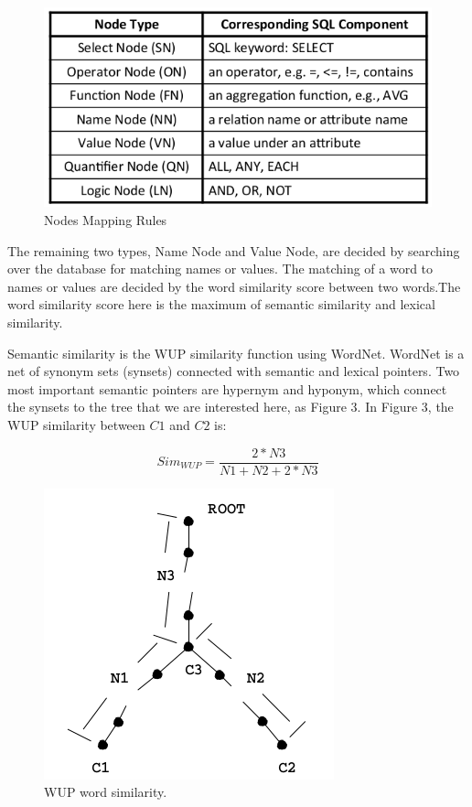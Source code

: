\documentclass[twocolumn]{article}
\begin{document}
\begin{figure}[ht]
  \centering
  \includegraphics[width=0.9\linewidth]{figures/nodes_mapping_rules.png}
  \caption[caption for nodes mapping rules]{Nodes Mapping Rules\protect\footnotemark}
\end{figure}

The remaining two types, Name Node and Value Node, are decided by searching over the database for matching names or values. The matching of a word to names or values are decided by the word similarity score between two words.The word similarity score here is the maximum of semantic similarity and lexical similarity.

Semantic similarity is the WUP similarity\cite{wu1994verbs} function using WordNet. WordNet is a net of synonym sets (synsets) connected with semantic and lexical pointers. Two most important semantic pointers are hypernym and hyponym, which connect the synsets to the tree that we are interested here, as Figure 3. In Figure 3, the WUP similarity between $C1$ and $C2$ is:

$$ Sim_{WUP} = \frac{2*N3}{N1+N2+2*N3} $$

\begin{figure}[ht]
  \centering
  \includegraphics[width=0.7\linewidth]{figures/wordnet_tree.png}
  \caption[caption for wordnet tree]{WUP word similarity.\protect\footnotemark }
\end{figure}
\end{document}
